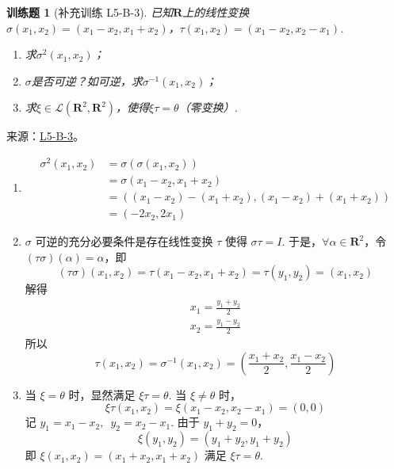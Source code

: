 \documentclass[UTF8,12pt,a4paper,fontset=fandol]{ctexart}
\newtheorem{exercise}{训练题}[section]
\begin{document}
\begin{exercise}[补充训练 L5-B-3]\label{prob:L5-B-3}
已知$\mathbf{R}$上的线性变换$\sigma(x_1,x_2)=(x_1-x_2,x_1+x_2)$，$\tau(x_1,x_2)=(x_1-x_2,x_2-x_1)$.
        \begin{enumerate}
            \item 求$\sigma^2(x_1,x_2)$；

            \item $\sigma$是否可逆？如可逆，求$\sigma^{-1}(x_1,x_2)$；

            \item 求$\xi\in \mathcal{L}(\mathbf{R}^2,\mathbf{R}^2)$，使得$\xi\tau=\theta$（零变换）.
        \end{enumerate}
\end{exercise}
\noindent 来源：\href{https://github.com/yhwu-is/Linear-Algebra-Left-Undone/blob/new/%E8%AE%B2%E4%B9%89/%E4%B8%93%E9%A2%98/5%20%E7%BA%BF%E6%80%A7%E6%98%A0%E5%B0%84.tex}{L5-B-3}。
\begin{solve}
\begin{enumerate}
                \item \begin{align*}
                          \sigma^2(x_1, x_2) & = \sigma(\sigma(x_1, x_2))                               \\
                                             & = \sigma(x_1 - x_2, x_1 + x_2)                           \\
                                             & = ((x_1 - x_2) - (x_1 + x_2), (x_1 - x_2) + (x_1 + x_2)) \\
                                             & = (-2 x_2, 2 x_1)
                      \end{align*}

                \item $ \sigma $ 可逆的充分必要条件是存在线性变换 $ \tau $ 使得 $ \sigma \tau = I $. 于是，$ \forall \alpha \in \mathbf{R}^2 $，令 $ (\tau \sigma)(\alpha) = \alpha $，即
                      \[ (\tau \sigma)(x_1, x_2) = \tau(x_1 - x_2, x_1 + x_2) = \tau(y_1, y_2) = (x_1, x_2) \]
                      解得
                      \begin{gather*}
                          x_1 = \frac{y_1 + y_2}{2} \\
                          x_2 = \frac{y_1 - y_2}{2}
                      \end{gather*}
                      所以
                      \[ \tau(x_1, x_2) = \sigma^{-1}(x_1, x_2) = \left(\frac{x_1 + x_2}{2}, \frac{x_1 - x_2}{2}\right) \]

                \item 当 $ \xi = \theta $ 时，显然满足 $ \xi \tau = \theta $. 当 $ \xi \neq \theta $ 时，
                      \[ \xi \tau(x_1, x_2) = \xi(x_1 - x_2, x_2 - x_1) = (0, 0) \]
                      记 $ y_1 = x_1 - x_2,\enspace y_2 = x_2 - x_1 $. 由于 $ y_1 + y_2 = 0 $，
                      \[ \xi(y_1, y_2) = (y_1 + y_2, y_1 + y_2) \]
                      即 $ \xi(x_1, x_2) = (x_1 + x_2, x_1 + x_2) $ 满足 $ \xi \tau = \theta $.
            \end{enumerate}
\end{solve}
\end{document}
